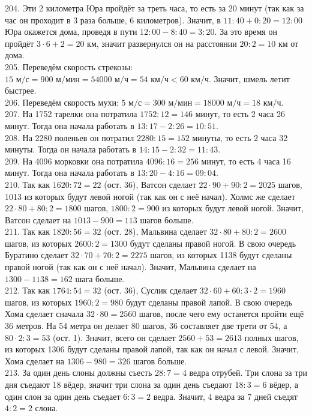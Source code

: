 \documentclass[12pt]{article}
\begin{document}
204. Эти 2 километра Юра пройдёт за треть часа, то есть за 20 минут (так как за час он проходит в 3 раза больше, 6 километров). Значит, в $11:40+0:20=12:00$ Юра окажется дома, проведя в пути $12:00-8:40=3:20.$ За это время он пройдёт $3\cdot6+2=20$ км, значит развернулся он на расстоянии $20:2=10$ км от дома.\\
205. Переведём скорость стрекозы: $15\text{ м/с}=900\text{ м/мин}=54000\text{ м/ч}=54\text{ км/ч}<60\text{ км/ч}.$ Значит, шмель летит быстрее.\\
206. Переведём скорость мухи: $5\text{ м/с}=300\text{ м/мин}=18000\text{ м/ч}=18\text{ км/ч}.$\\
207. На 1752 тарелки она потратила $1752:12=146$ минут, то есть 2 часа 26 минут. Тогда она начала работать в  $13:17-2:26=10:51.$\\
208. На 2280 поленьев он потратил $2280:15=152$ минуты, то есть 2 часа 32 минуты. Тогда он начала работать в  $14:15-2:32=11:43.$\\
209. На 4096 морковки она потратила $4096:16=256$ минут, то есть 4 часа 16 минут. Тогда она начала работать в  $13:20-4:16=09:04.$\\
210. Так как $1620:72=22$ (ост. 36), Ватсон сделает $22\cdot90+90:2=2025$ шагов, 1013 из которых будут левой ногой (так как он с неё начал). Холмс же сделает $22\cdot80+80:2=1800$ шагов, $1800:2=900$ из которых будут левой ногой. Значит, Ватсон сделает на $1013-900=113$ шагов больше.\\
211. Так как $1820:56=32$ (ост. 28), Мальвина сделает $32\cdot80+80:2=2600$ шагов, из которых $2600:2=1300$ будут сделаны правой ногой. В свою очередь Буратино сделает $32\cdot70+70:2=2275$ шагов, из которых 1138 будут сделаны правой ногой (так как он с неё начал). Значит, Мальвина сделает на $1300-1138=162$ шага больше.\\
212. Так как $1764:54=32$ (ост. 36), Суслик сделает $32\cdot60+60:3\cdot2=1960$ шагов, из которых $1960:2=980$ будут сделаны правой лапой. В свою очередь Хома сделает сначала $32\cdot80=2560$ шагов, после чего ему останется пройти ещё 36 метров. На 54 метра он делает 80 шагов, 36 составляет две трети от 54, а  $80\cdot2:3=53$ (ост. 1). Значит, всего он сделает $2560+53=2613$ полных шагов, из которых 1306 будут сделаны правой лапой, так как он начал с левой. Значит, Хома сделает на $1306-980=326$ шагов больше.\\
213. За один день слоны должны съесть $28:7=4$ ведра отрубей. Три слона за три дня съедают 18 вёдер, значит три слона за один день съедают $18:3=6$ вёдер, а один слон за один день съедает $6:3=2$ ведра. Значит, 4 ведра за 7 дней съедят $4:2=2$ слона.\\
\end{document}
